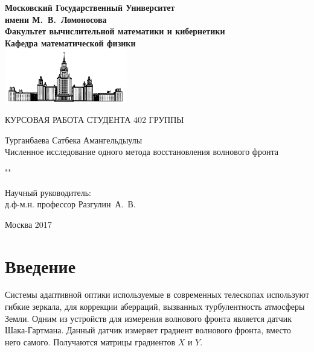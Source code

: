 \documentclass[oneside, final, 14pt]{article}
\begin{document}
\sloppy
	\renewcommand\contentsname{Содержание} %

\begin{titlepage}
\begin{center}
\bfseries
Московский Государственный Университет \\имени М.~В.~Ломоносова\\
Факультет вычислительной математики и кибернетики\\
Кафедра математической физики\\
\includegraphics[width=0.4\textwidth]{msu_logo_small.png}\\
\vfill	

\mdseries
\begin{Large}
КУРСОВАЯ РАБОТА СТУДЕНТА 402 ГРУППЫ\\
\end{Large}
Турганбаева Сатбека Амангельдыулы\\
\vfill	
Численное исследование одного метода восстановления волнового фронта\\
\vspace{1cm}
\bfseries
\begin{Large}
""\\
\end{Large}
\vfill	

  \begin{flushright}
        Научный руководитель:\\
        д.ф-м.н. профессор Разгулин~А.~В.
    \end{flushright}

\vfill	


\end{center}

\begin{center}
	Москва 2017
\end{center}

\end{titlepage}

\tableofcontents

\newpage
\section*{Введение}
Системы адаптивной оптики используемые в современных телескопах используют гибкие зеркала, для коррекции аберраций, вызванных турбулентность атмосферы Земли. Одним из устройств для измерения волнового фронта является датчик Шака-Гартмана. Данный датчик измеряет градиент волнового фронта, вместо него самого. Получаются матрицы градиентов $X$ и $Y$.
\end{document}
